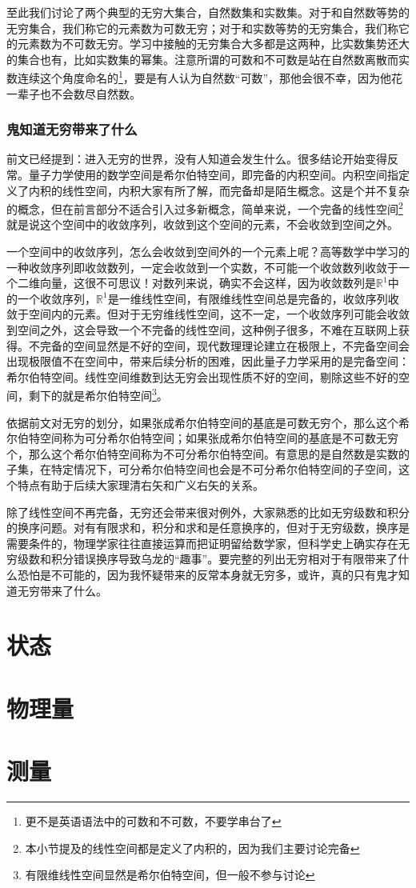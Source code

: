 \documentclass[../../main.tex]{subfiles}
\begin{document}
至此我们讨论了两个典型的无穷大集合，自然数集和实数集。对于和自然数等势的无穷集合，我们称它的元素数为可数无穷；对于和实数等势的无穷集合，我们称它的元素数为不可数无穷。学习中接触的无穷集合大多都是这两种，比实数集势还大的集合也有，比如实数集的幂集。注意所谓的可数和不可数是站在自然数离散而实数连续这个角度命名的\footnote{更不是英语语法中的可数和不可数，不要学串台了}，要是有人认为自然数“可数”，那他会很不幸，因为他花一辈子也不会数尽自然数。
\subsubsection{鬼知道无穷带来了什么}
前文已经提到：进入无穷的世界，没有人知道会发生什么。很多结论开始变得反常。量子力学使用的数学空间是希尔伯特空间，即完备的内积空间。内积空间指定义了内积的线性空间，内积大家有所了解，而完备却是陌生概念。这是个并不复杂的概念，但在前言部分不适合引入过多新概念，简单来说，一个完备的线性空间\footnote{本小节提及的线性空间都是定义了内积的，因为我们主要讨论完备}就是说这个空间中的收敛序列，收敛到这个空间的元素，不会收敛到空间之外。

一个空间中的收敛序列，怎么会收敛到空间外的一个元素上呢？高等数学中学习的一种收敛序列即收敛数列，一定会收敛到一个实数，不可能一个收敛数列收敛于一个二维向量，这很不可思议！对数列来说，确实不会这样，因为收敛数列是\(\mathbb{R}^1\)中的一个收敛序列，\(\mathbb{R}^1\)是一维线性空间，有限维线性空间总是完备的，收敛序列收敛于空间内的元素。但对于无穷维线性空间，这不一定，一个收敛序列可能会收敛到空间之外，这会导致一个不完备的线性空间，这种例子很多，不难在互联网上获得。不完备的空间显然是不好的空间，现代数理理论建立在极限上，不完备空间会出现极限值不在空间中，带来后续分析的困难，因此量子力学采用的是完备空间：希尔伯特空间。线性空间维数到达无穷会出现性质不好的空间，剔除这些不好的空间，剩下的就是希尔伯特空间\footnote{有限维线性空间显然是希尔伯特空间，但一般不参与讨论}。

依据前文对无穷的划分，如果张成希尔伯特空间的基底是可数无穷个，那么这个希尔伯特空间称为可分希尔伯特空间；如果张成希尔伯特空间的基底是不可数无穷个，那么这个希尔伯特空间称为不可分希尔伯特空间。有意思的是自然数是实数的子集，在特定情况下，可分希尔伯特空间也会是不可分希尔伯特空间的子空间，这个特点有助于后续大家理清右矢和广义右矢的关系。

除了线性空间不再完备，无穷还会带来很对例外，大家熟悉的比如无穷级数和积分的换序问题。对有有限求和，积分和求和是任意换序的，但对于无穷级数，换序是需要条件的，物理学家往往直接运算而把证明留给数学家，但科学史上确实存在无穷级数和积分错误换序导致乌龙的“趣事”。要完整的列出无穷相对于有限带来了什么恐怕是不可能的，因为我怀疑带来的反常本身就无穷多，或许，真的只有鬼才知道无穷带来了什么。

\section{状态}


\section{物理量}
\section{测量}
\end{document}
